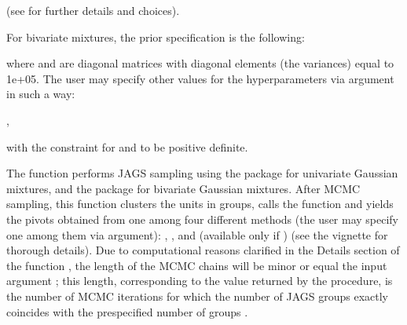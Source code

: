 \documentclass[a4paper]{book}
\begin{document}
\begin{Details}
(see  for further details and choices).

For bivariate mixtures, the prior specification is the following:


where  and  are diagonal matrices
with diagonal elements (the variances)
equal to 1e+05. The user may specify other values for the hyperparameters
 via  argument in such a way:

,

with the constraint for  and  to be positive definite.

The function performs JAGS sampling using the  package for univariate Gaussian mixtures, and the 
package for bivariate Gaussian mixtures. After MCMC sampling, this function
clusters the units in  groups,
calls the  function and yields the
pivots obtained from one among four different
methods (the user may specify one among them via 
argument):
, , 
and  (available only if )
(see the vignette for thorough details). Due to computational reasons
clarified in the Details section of the function , the
length of the MCMC chains will be minor or equal the input
argument ; this length, corresponding to the value
 returned by the procedure, is the number of
MCMC iterations for which
the number of JAGS groups exactly coincides with the prespecified
number of groups .
\end{Details}
%
\end{document}
